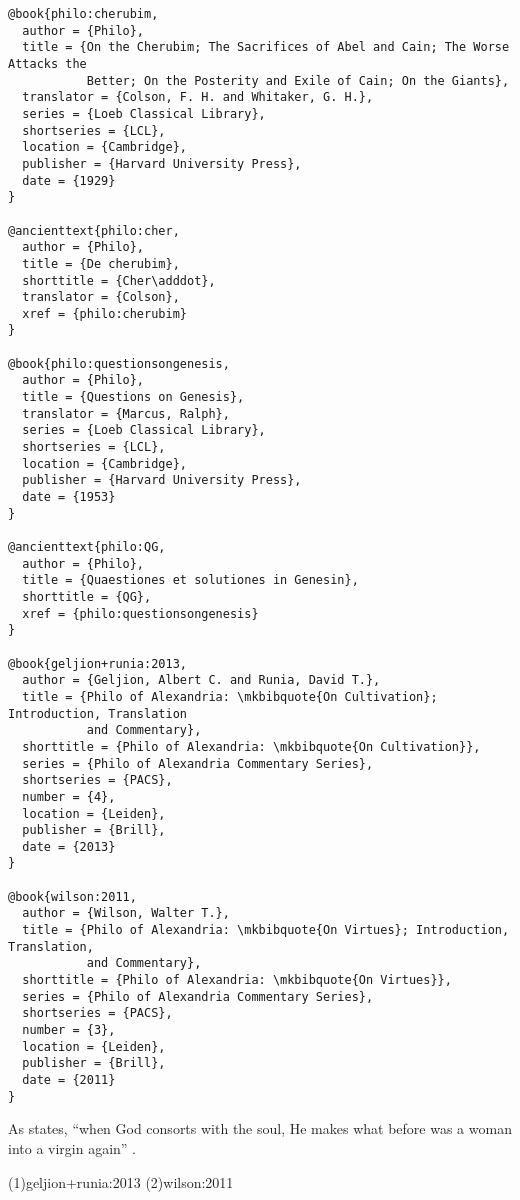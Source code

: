 \documentclass[a4paper]{article}
\begin{document}
\begin{verbatim}
@book{philo:cherubim,
  author = {Philo},
  title = {On the Cherubim; The Sacrifices of Abel and Cain; The Worse Attacks the
           Better; On the Posterity and Exile of Cain; On the Giants},
  translator = {Colson, F. H. and Whitaker, G. H.},
  series = {Loeb Classical Library},
  shortseries = {LCL},
  location = {Cambridge},
  publisher = {Harvard University Press},
  date = {1929}
}

@ancienttext{philo:cher,
  author = {Philo},
  title = {De cherubim},
  shorttitle = {Cher\adddot},
  translator = {Colson},
  xref = {philo:cherubim}
}

@book{philo:questionsongenesis,
  author = {Philo},
  title = {Questions on Genesis},
  translator = {Marcus, Ralph},
  series = {Loeb Classical Library},
  shortseries = {LCL},
  location = {Cambridge},
  publisher = {Harvard University Press},
  date = {1953}
}

@ancienttext{philo:QG,
  author = {Philo},
  title = {Quaestiones et solutiones in Genesin},
  shorttitle = {QG},
  xref = {philo:questionsongenesis}
}

@book{geljion+runia:2013,
  author = {Geljion, Albert C. and Runia, David T.},
  title = {Philo of Alexandria: \mkbibquote{On Cultivation}; Introduction, Translation
           and Commentary},
  shorttitle = {Philo of Alexandria: \mkbibquote{On Cultivation}},
  series = {Philo of Alexandria Commentary Series},
  shortseries = {PACS},
  number = {4},
  location = {Leiden},
  publisher = {Brill},
  date = {2013}
}

@book{wilson:2011,
  author = {Wilson, Walter T.},
  title = {Philo of Alexandria: \mkbibquote{On Virtues}; Introduction, Translation,
           and Commentary},
  shorttitle = {Philo of Alexandria: \mkbibquote{On Virtues}},
  series = {Philo of Alexandria Commentary Series},
  shortseries = {PACS},
  number = {3},
  location = {Leiden},
  publisher = {Brill},
  date = {2011}
}
\end{verbatim}

\begin{verbcite}
  As \citeauthor{philo:cher} states, “when God consorts with the soul, He makes
  what before was a woman into a virgin again” .
\end{verbcite}
\examplecite(1){geljion+runia:2013}
\examplecite(2){wilson:2011}
\exampleancientsources
\examplesecondarysources
\examplebibliography
{}
\end{document}
